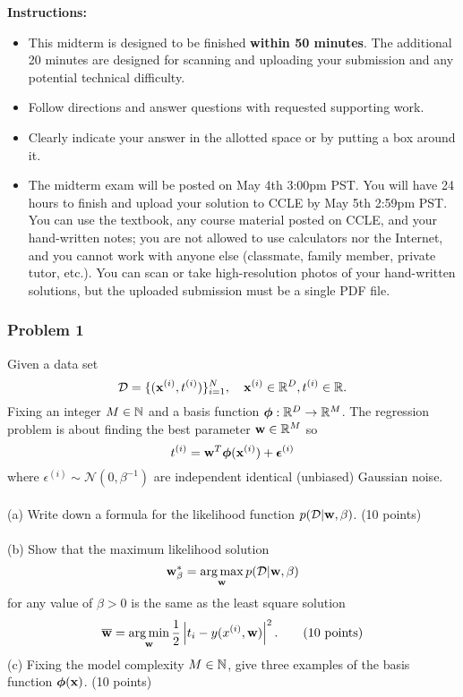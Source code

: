 \documentclass[12pt,a4paper]{article}
\renewcommand{\v}[1]{\ifmmode\mathbf{#1}\fi}
\newcommand{\ra}[1]{\ifnum #1=1\rightarrow\fi\ifnum #1=2\Rightarrow\fi\ifnum #1=3\Rrightarrow\fi\ifnum #1=4\rightrightarrows\fi\ifnum #1=5\rightleftarrows\fi\ifnum #1=6\mapsto\fi\ifnum #1=7\iffalse\fi\fi\ifnum #1=8\twoheadrightarrow\fi\ifnum #1=9\rightharpoonup\fi\ifnum #1=0\rightharpoondown\fi}
\renewcommand{\l}{\left}
\renewcommand{\r}{\right}
\DeclareMathOperator*{\argmin}{arg\,min}
\DeclareMathOperator*{\argmax}{arg\,max}
\def\R{\ifmmode\mathbb R\fi}
\def\N{\ifmmode\mathbb N\fi}
\begin{document}
\noindent\textbf{Instructions:}
\begin{itemize}
	\item This midterm is designed to be finished \textbf{within 50 minutes}. 
		The additional 20 minutes are designed for scanning and uploading your submission and any potential technical difficulty. 
    \item Follow directions and answer questions with requested supporting work.
    \item Clearly indicate your answer in the allotted space or by putting a box around it.
    \item The midterm exam will be posted on May 4th 3:00pm PST. You will have 24 hours to finish and upload your solution to CCLE by May 5th 2:59pm PST. You can use the textbook, any course material posted on CCLE, and your hand-written notes; you are not allowed to use calculators nor the Internet, and you cannot work with anyone else (classmate, family member, private tutor, etc.). You can scan or take high-resolution photos of your hand-written solutions, but the uploaded submission must be a single PDF file.
\end{itemize}

\newpage
\subsubsection*{Problem 1}
Given a data set 
\begin{equation*}
\mathcal D = \{ (\v x^{(i)}, t^{(i)}) \}_{i=1}^N, \hskip10pt \v x^{(i)} \in \R^D, t^{(i)} \in \R.
\end{equation*}
Fixing an integer $M \in \N$ and a basis function $\boldsymbol\phi: \R^D \ra1 \R^M$. The regression problem is about finding the best parameter $\v w \in \R^M$ so
\begin{equation*}
t^{(i)} = \v w^T \boldsymbol\phi(\v x^{(i)}) + \boldsymbol \epsilon^{(i)}
\end{equation*}
where $\epsilon^{(i)} \sim \mathcal N(0, \beta^{-1})$ are independent identical (unbiased) Gaussian noise. \\
\\
(a) Write down a formula for the likelihood function $p(\mathcal D \vert \v w, \beta)$. (10 points) \\
\\
(b) Show that the maximum likelihood solution 
\begin{equation*}
\v w^\ast_\beta = \argmax_{\v w} p(\mathcal D \vert \v w, \beta)
\end{equation*} for any value of $\beta > 0$ is the same as the least square solution 
\begin{equation*}
\overline {\v w} = \argmin_{\v w} \frac12 \l|t_i - y(x^{(i)}, \v w)\r|^2. \hskip20pt\text{(10 points)}
\end{equation*}
(c) Fixing the model complexity $M \in \N$, give three examples of the basis function $\boldsymbol\phi(\v x)$. (10 points)
\end{document}
